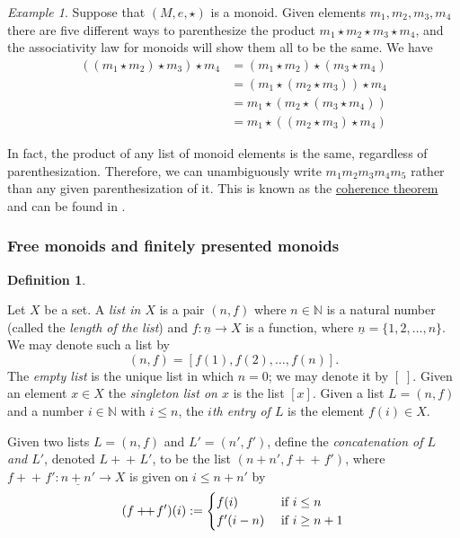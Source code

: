 \documentclass{book}
\def\tn{\textnormal}
\def\NN{{\mathbb N}}
\def\to{\rightarrow}
\def\taking{\colon}
\def\ul{\underline}
\def\plpl{+\!\!+\hspace{1pt}}
\theoremstyle{remark}
\newtheorem{example}[subsubsection]{Example}
\theoremstyle{definition}
\newtheorem{definition}[subsubsection]{Definition}
\begin{document}
\begin{example}

Suppose that $(M,e,\star)$ is a monoid. Given elements $m_1,m_2,m_3,m_4$ there are five different ways to parenthesize the product $m_1\star m_2\star m_3\star m_4$, and the associativity law for monoids will show them all to be the same. We have
\begin{align*}
((m_1\star m_2)\star m_3)\star m_4&=(m_1\star m_2)\star (m_3\star m_4)\\
&=(m_1\star(m_2\star m_3))\star m_4\\
&=m_1\star(m_2\star (m_3\star m_4))\\
&=m_1\star((m_2\star m_3)\star m_4)
\end{align*}

In fact, the product of any list of monoid elements is the same, regardless of parenthesization. Therefore, we can unambiguously write $m_1m_2m_3m_4m_5$ rather than any given parenthesization of it. This is known as the \href{http://en.wikipedia.org/wiki/Coherence_theorem}{\text coherence theorem} and can be found in \cite{Mac}.

\end{example}


\subsubsection{Free monoids and finitely presented monoids}\label{sec:free monoid}

\begin{definition}\label{def:list}

Let $X$ be a set. A {\em list in $X$} is a pair $(n,f)$ where $n\in\NN$ is a natural number (called the {\em length of the list}) and $f\taking\ul{n}\to X$ is a function, where $\ul{n}=\{1,2,\ldots,n\}$. We may denote such a list by 
$$(n,f)=[f(1),f(2),\ldots,f(n)].$$ 
The {\em empty list} is the unique list in which $n=0$; we may denote it by $[\;]$. Given an element $x\in X$ the {\em singleton list on $x$} is the list $[x]$. Given a list $L=(n,f)$ and a number $i\in\NN$ with $i\leq n$, the {\em $i$th entry of $L$} is the element $f(i)\in X$. 

Given two lists $L=(n,f)$ and $L'=(n',f')$, define the {\em concatenation of $L$ and $L'$}, denoted $L\plpl L'$,\index{a symbol!$\plpl$} to be the list $(n+n',f\plpl f')$, where $f\plpl f'\taking \ul{n+n'}\to X$ is given on $i\leq n+n'$ by
$$(f\plpl f')(i):=
\begin{cases}
f(i)&\tn{ if }i\leq n\\
f'(i-n)&\tn{ if }i\geq n+1
\end{cases}
$$
\end{definition}
\end{document}
